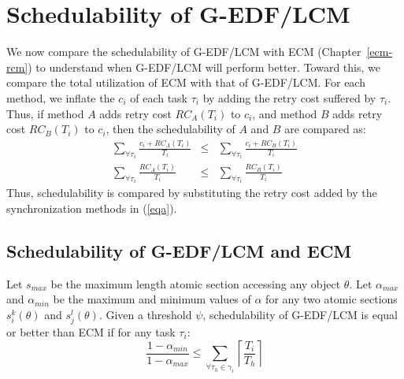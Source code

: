 \section{Schedulability of G-EDF/LCM}
\label{performance g-edf-lcm}
We now compare the schedulability of G-EDF/LCM with ECM (Chapter~\ref{ecm-rcm}) to understand when G-EDF/LCM will perform better. 
Toward this, we compare the total utilization of ECM with that of G-EDF/LCM. For each method, we inflate the $c_i$ of each task $\tau_i$ by adding the retry cost suffered by $\tau_i$. Thus, if method $A$ adds retry cost $RC_A(T_i)$ to $c_i$, and method $B$ adds retry cost $RC_B(T_i)$ to $c_i$, then the schedulability of $A$ and $B$ are compared as:
\begin{eqnarray}
\sum_{\forall \tau_{i}}\frac{c_{i}+RC_A(T_{i})}{T_{i}} & \le & \sum_{\forall \tau_{i}}\frac{c_{i}+RC_B(T_{i})}{T_{i}}\nonumber\\
\sum_{\forall \tau_{i}}\frac{RC_A(T_{i})}{T_{i}} & \le & \sum_{\forall \tau_{i}}\frac{RC_B(T_{i})}{T_{i}}
\label{eqa}\end{eqnarray}
Thus, schedulability is compared by substituting the retry cost added by the synchronization methods in (\ref{eqa}).

\subsection{Schedulability of G-EDF/LCM and ECM}
\begin{clm}\label{lcm versus ecm}
Let $s_{max}$ be the maximum length atomic section accessing any object $\theta$. Let $\alpha_{max}$ and $\alpha_{min}$ be the maximum and minimum values of $\alpha$ for any two atomic sections $s_i^k(\theta)$ and $s_j^l(\theta)$. Given a threshold $\psi$, schedulability of G-EDF/LCM is equal or better than ECM if for any task $\tau_i$:
\begin{equation}
\frac{1-\alpha_{min}}{1-\alpha_{max}} \le \sum_{\forall \tau_h \in \gamma_i}\left\lceil\frac{T_i}{T_h}\right\rceil
\label{edf-lcm-ecm}\end{equation}
\end{clm}

